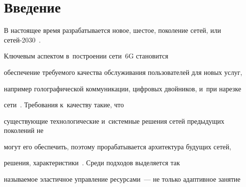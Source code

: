 














 \thispagestyle{headings}


 


 \vspace*{-12pt}





\section{Введение}





\vspace*{-4pt}








В настоящее время разрабатывается новое, шестое, поколение сетей, или сетей-2030~\cite{ITU,3GPP23501}. 


Ключевым аспектом в~построении сети~6G становится 


обеспечение требуемого качества обслуживания пользователей для новых услуг, 


например голографической коммуникации, цифровых двойников, и~при нарезке 


сети~\cite{Kochetkova2021a,Vlaskina2022}. Требования к~качеству такие, что 


существующие технологические и~системные решения сетей предыдущих поколений не 


могут его обеспечить, поэтому прорабатывается архитектура будущих сетей, 


решения, характеристики~\cite{Moltchanov2022}. Среди подходов выделяется так 


называемое эластичное управление ресурсами~--- не только адаптивное занятие 


